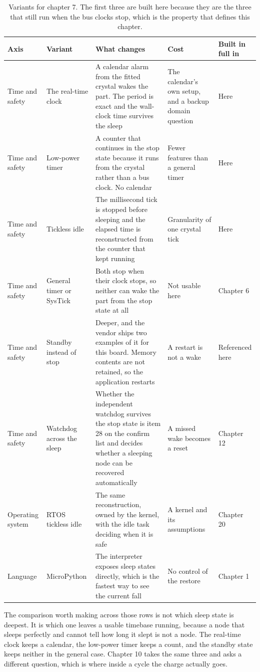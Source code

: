 \begin{table}[H]\centering\small
\begin{tabular}{p{24mm}p{26mm}p{44mm}p{22mm}p{20mm}}
\toprule
Axis & Variant & What changes & Cost & Built in full in \\
\midrule
Time and safety & The real-time clock & A calendar alarm from the fitted crystal wakes the part. The period is exact and the wall-clock time survives the sleep & The calendar's own setup, and a backup domain question & Here \\
Time and safety & Low-power timer & A counter that continues in the stop state because it runs from the crystal rather than a bus clock. No calendar & Fewer features than a general timer & Here \\
Time and safety & Tickless idle & The millisecond tick is stopped before sleeping and the elapsed time is reconstructed from the counter that kept running & Granularity of one crystal tick & Here \\
Time and safety & General timer or SysTick & Both stop when their clock stops, so neither can wake the part from the stop state at all & Not usable here & Chapter 6 \\
Time and safety & Standby instead of stop & Deeper, and the vendor ships two examples of it for this board. Memory contents are not retained, so the application restarts & A restart is not a wake & Referenced here \\
Time and safety & Watchdog across the sleep & Whether the independent watchdog survives the stop state is item 28 on the confirm list and decides whether a sleeping node can be recovered automatically & A missed wake becomes a reset & Chapter 12 \\
Operating system & RTOS tickless idle & The same reconstruction, owned by the kernel, with the idle task deciding when it is safe & A kernel and its assumptions & Chapter 20 \\
Language & MicroPython & The interpreter exposes sleep states directly, which is the fastest way to see the current fall & No control of the restore & Chapter 1 \\
\bottomrule
\end{tabular}
\caption{Variants for chapter 7. The first three are built here because they are the three that still run when the bus clocks stop, which is the property that defines this chapter.}
\end{table}

The comparison worth making across those rows is not which sleep state is
deepest. It is which one leaves a usable timebase running, because a node that
sleeps perfectly and cannot tell how long it slept is not a node. The real-time
clock keeps a calendar, the low-power timer keeps a count, and the standby state
keeps neither in the general case. Chapter 10 takes the same three and asks a
different question, which is where inside a cycle the charge actually goes.

